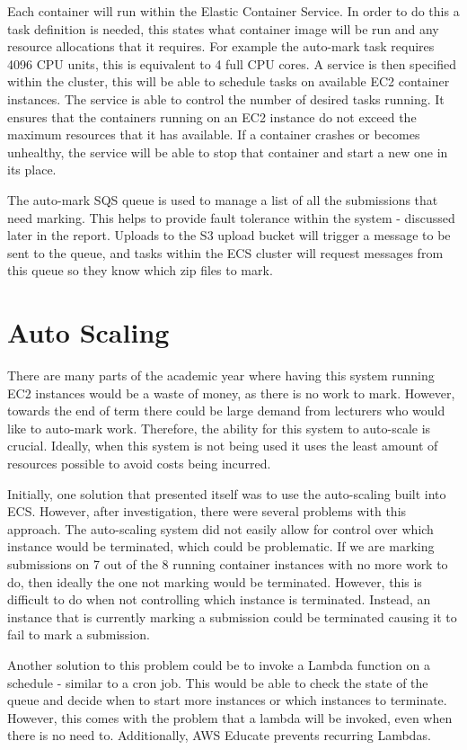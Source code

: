 \documentclass[runningheads]{llncs}
\begin{document}
Each container will run within the Elastic Container Service. In order to do this a task definition is needed, this states what container image will be run and any resource allocations that it requires. For example the auto-mark task requires 4096 CPU units, this is equivalent to 4 full CPU cores. A service is then specified within the cluster, this will be able to schedule tasks on available EC2 container instances. The service is able to control the number of desired tasks running. It ensures that the containers running on an EC2 instance do not exceed the maximum resources that it has available. If a container crashes or becomes unhealthy, the service will be able to stop that container and start a new one in its place.

The auto-mark SQS queue is used to manage a list of all the submissions that need marking. This helps to provide fault tolerance within the system - discussed later in the report. Uploads to the S3 upload bucket will trigger a message to be sent to the queue, and tasks within the ECS cluster will request messages from this queue so they know which zip files to mark.


\section{Auto Scaling}
There are many parts of the academic year where having this system running EC2 instances would be a waste of money, as there is no work to mark. However, towards the end of term there could be large demand from lecturers who would like to auto-mark work. Therefore, the ability for this system to auto-scale is crucial. Ideally, when this system is not being used it uses the least amount of resources possible to avoid costs being incurred.

Initially, one solution that presented itself was to use the auto-scaling built into ECS. However, after investigation, there were several problems with this approach. The auto-scaling system did not easily allow for control over which instance would be terminated, which could be problematic. If we are marking submissions on 7 out of the 8 running container instances with no more work to do, then ideally the one not marking would be terminated. However, this is difficult to do when not controlling which instance is terminated. Instead, an instance that is currently marking a submission could be terminated causing it to fail to mark a submission. 

Another solution to this problem could be to invoke a Lambda function on a schedule - similar to a cron job. This would be able to check the state of the queue and decide when to start more instances or which instances to terminate. However, this comes with the problem that a lambda will be invoked, even when there is no need to. Additionally, AWS Educate prevents recurring Lambdas.
\end{document}
